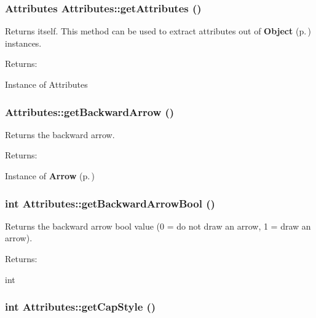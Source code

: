 \subsubsection{\setlength{\rightskip}{0pt plus 5cm}Attributes Attributes::get\-Attributes ()\hspace{0.3cm}{\tt  [inline]}}\label{classAttributes_a45}


Returns itself. This method can be used to extract attributes out of {\bf Object} {\rm (p.\,\pageref{classObject})} instances. \begin{Desc}
\item[Returns: ]\par
Instance of Attributes \end{Desc}
\subsubsection{ Attributes::get\-Backward\-Arrow ()\hspace{0.3cm}{\tt  [inline]}}\label{classAttributes_a38}


Returns the backward arrow. \begin{Desc}
\item[Returns: ]\par
Instance of {\bf Arrow} {\rm (p.\,\pageref{classArrow})} \end{Desc}
\subsubsection{\setlength{\rightskip}{0pt plus 5cm}int Attributes::get\-Backward\-Arrow\-Bool ()\hspace{0.3cm}{\tt  [inline]}}\label{classAttributes_a36}


Returns the backward arrow bool value (0 = do not draw an arrow, 1 = draw an arrow). \begin{Desc}
\item[Returns: ]\par
int \end{Desc}
\subsubsection{\setlength{\rightskip}{0pt plus 5cm}int Attributes::get\-Cap\-Style ()\hspace{0.3cm}{\tt  [inline]}}\label{classAttributes_a33}


